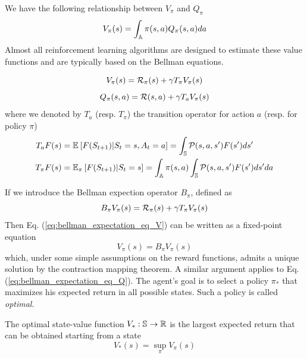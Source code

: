 We have the following relationship between $V_\pi$ and $Q_\pi$
\begin{equation}
	V_\pi(s) = \int_\A \pi(s,a) Q_\pi(s,a) da
\end{equation}
Almost all reinforcement learning algorithms are designed to estimate these 
value functions and are typically based on the Bellman equations.
\begin{proposition}
	\begin{equation}
		V_\pi(s) = \calR_\pi(s) + \gamma T_\pi V_\pi(s)	
		\label{eq:bellman_expectation_eq_V}
	\end{equation}
	\begin{equation}
			Q_\pi(s,a) = \calR(s,a) + \gamma T_a V_\pi(s)
			\label{eq:bellman_expectation_eq_Q}
	\end{equation}
	where we denoted by $T_a$ (resp. $T_\pi$) the transition operator for action 
	$a$ (resp. for policy $\pi$)
	\begin{equation*}
		\begin{split}
			T_a F(s) &= \E{F(S_{t+1})|S_t = s, A_t = a} = \int_\S \calP(s, a, s') F(s') ds'\\
			T_\pi F(s) &= \E[\pi]{F(S_{t+1})|S_t = s} = \int_\A \pi(s,a) \int_\S \calP(s,a,s') F(s') ds'
			da\\ 
		\end{split}
	\end{equation*}
\end{proposition}
If we introduce the Bellman expection operator $B_\pi$, defined as 
\begin{equation*}
	B_\pi V_\pi(s) = \calR_\pi(s) + \gamma T_\pi V_\pi(s)	
\end{equation*}
Then Eq. (\ref{eq:bellman_expectation_eq_V}) can be written as a fixed-point equation
\begin{equation*}
	V_\pi(s) = B_\pi V_\pi(s)
\end{equation*}
which, under some simple assumptions on the reward functions, admits a unique
solution by the contraction mapping theorem. A similar argument applies to Eq.
(\ref{eq:bellman_expectation_eq_Q}). The agent's goal is to select a policy
$\pi_*$ that maximizes his expected return in all possible states. Such a
policy is called \emph{optimal}.
\begin{definition}
	The optimal state-value function $V_*: \S \to \R$ is the largest expected 
	return that can be obtained starting from a state
	\begin{equation}
		V_*(s) = \sup_\pi V_\pi(s)
	\end{equation}
\end{definition}
